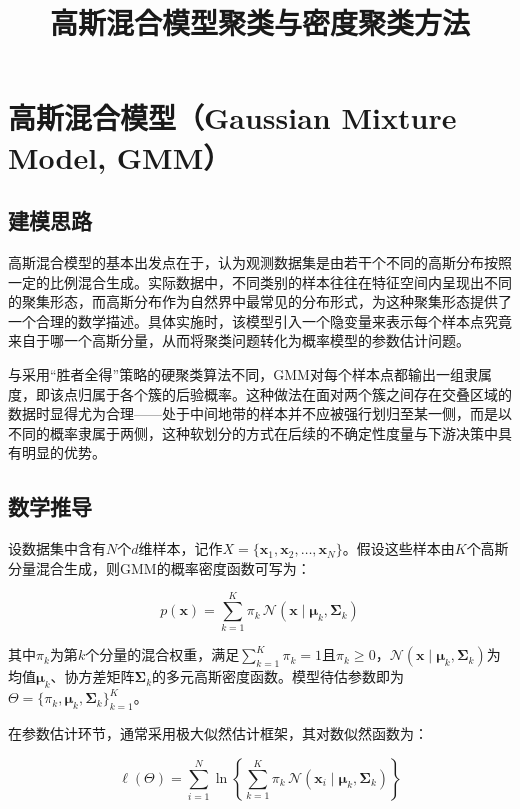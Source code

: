 \documentclass{article}
\title{高斯混合模型聚类与密度聚类方法}
\author{}
\date{}
\begin{document}
\maketitle

\section{高斯混合模型（Gaussian Mixture Model, GMM）}

\subsection{建模思路}

高斯混合模型的基本出发点在于，认为观测数据集是由若干个不同的高斯分布按照一定的比例混合生成。实际数据中，不同类别的样本往往在特征空间内呈现出不同的聚集形态，而高斯分布作为自然界中最常见的分布形式，为这种聚集形态提供了一个合理的数学描述。具体实施时，该模型引入一个隐变量来表示每个样本点究竟来自于哪一个高斯分量，从而将聚类问题转化为概率模型的参数估计问题。

与采用“胜者全得”策略的硬聚类算法不同，GMM对每个样本点都输出一组隶属度，即该点归属于各个簇的后验概率。这种做法在面对两个簇之间存在交叠区域的数据时显得尤为合理——处于中间地带的样本并不应被强行划归至某一侧，而是以不同的概率隶属于两侧，这种软划分的方式在后续的不确定性度量与下游决策中具有明显的优势。

\subsection{数学推导}

设数据集中含有$N$个$d$维样本，记作$X=\{\boldsymbol{x}_1,\boldsymbol{x}_2,\dots,\boldsymbol{x}_N\}$。假设这些样本由$K$个高斯分量混合生成，则GMM的概率密度函数可写为：

\begin{equation}
p(\boldsymbol{x}) = \sum_{k=1}^{K} \pi_k \, \mathcal{N}(\boldsymbol{x} \mid \boldsymbol{\mu}_k, \boldsymbol{\Sigma}_k)
\end{equation}

其中$\pi_k$为第$k$个分量的混合权重，满足$\sum_{k=1}^{K}\pi_k=1$且$\pi_k \geq 0$，$\mathcal{N}(\boldsymbol{x} \mid \boldsymbol{\mu}_k, \boldsymbol{\Sigma}_k)$为均值$\boldsymbol{\mu}_k$、协方差矩阵$\boldsymbol{\Sigma}_k$的多元高斯密度函数。模型待估参数即为$\Theta = \{\pi_k, \boldsymbol{\mu}_k, \boldsymbol{\Sigma}_k\}_{k=1}^{K}$。

在参数估计环节，通常采用极大似然估计框架，其对数似然函数为：

\begin{equation}
\ell(\Theta) = \sum_{i=1}^{N} \ln \left\{ \sum_{k=1}^{K} \pi_k \, \mathcal{N}(\boldsymbol{x}_i \mid \boldsymbol{\mu}_k, \boldsymbol{\Sigma}_k) \right\}
\end{equation}
\end{document}
